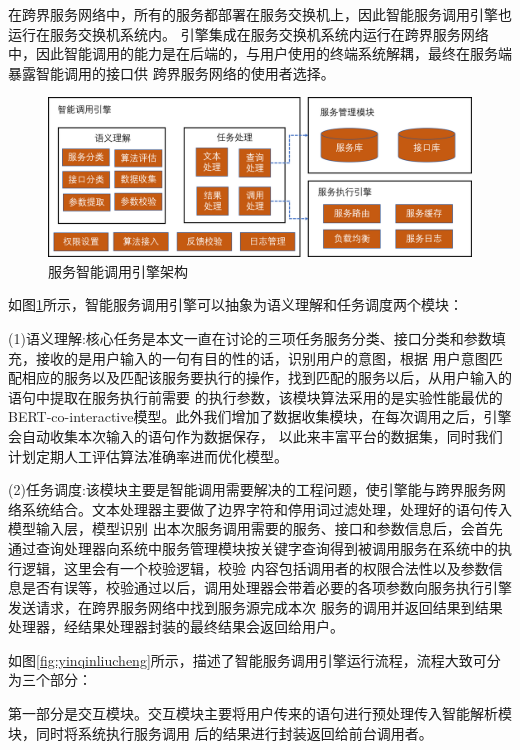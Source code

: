 在跨界服务网络中，所有的服务都部署在服务交换机上，因此智能服务调用引擎也运行在服务交换机系统内。
引擎集成在服务交换机系统内运行在跨界服务网络中，因此智能调用的能力是在后端的，与用户使用的终端系统解耦，最终在服务端暴露智能调用的接口供
跨界服务网络的使用者选择。

\begin{figure}[htbp]
  \centering
  \includegraphics[width=15cm]{./images/yinqing.png}
  \caption{服务智能调用引擎架构}
  \label{fig:yinqing}
\end{figure}

如图\ref{fig:yinqing}所示，智能服务调用引擎可以抽象为语义理解和任务调度两个模块：

(1)语义理解:核心任务是本文一直在讨论的三项任务服务分类、接口分类和参数填充，接收的是用户输入的一句有目的性的话，识别用户的意图，根据
用户意图匹配相应的服务以及匹配该服务要执行的操作，找到匹配的服务以后，从用户输入的语句中提取在服务执行前需要
的执行参数，该模块算法采用的是实验性能最优的BERT-co-interactive模型。此外我们增加了数据收集模块，在每次调用之后，引擎会自动收集本次输入的语句作为数据保存，
以此来丰富平台的数据集，同时我们计划定期人工评估算法准确率进而优化模型。

(2)任务调度:该模块主要是智能调用需要解决的工程问题，使引擎能与跨界服务网络系统结合。文本处理器主要做了边界字符和停用词过滤处理，处理好的语句传入模型输入层，模型识别
出本次服务调用需要的服务、接口和参数信息后，会首先通过查询处理器向系统中服务管理模块按关键字查询得到被调用服务在系统中的执行逻辑，这里会有一个校验逻辑，校验
内容包括调用者的权限合法性以及参数信息是否有误等，校验通过以后，调用处理器会带着必要的各项参数向服务执行引擎发送请求，在跨界服务网络中找到服务源完成本次
服务的调用并返回结果到结果处理器，经结果处理器封装的最终结果会返回给用户。

如图\ref{fig:yinqinliucheng}所示，描述了智能服务调用引擎运行流程，流程大致可分为三个部分：

第一部分是交互模块。交互模块主要将用户传来的语句进行预处理传入智能解析模块，同时将系统执行服务调用
后的结果进行封装返回给前台调用者。

